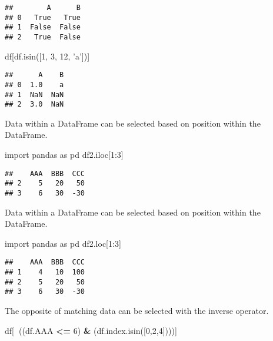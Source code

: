 \documentclass[]{book}
\newenvironment{Shaded}{\begin{snugshade}}{\end{snugshade}}
\newcommand{\DecValTok}[1]{\textcolor[rgb]{0.00,0.00,0.81}{#1}}
\newcommand{\StringTok}[1]{\textcolor[rgb]{0.31,0.60,0.02}{#1}}
\newcommand{\ImportTok}[1]{#1}
\newcommand{\OperatorTok}[1]{\textcolor[rgb]{0.81,0.36,0.00}{\textbf{#1}}}
\newcommand{\NormalTok}[1]{#1}
\begin{document}
\begin{verbatim}
##        A      B
## 0   True   True
## 1  False  False
## 2   True  False
\end{verbatim}

\begin{Shaded}
\begin{Highlighting}[]
\NormalTok{df[df.isin([}\DecValTok{1}\NormalTok{, }\DecValTok{3}\NormalTok{, }\DecValTok{12}\NormalTok{, }\StringTok{'a'}\NormalTok{])]}
\end{Highlighting}
\end{Shaded}

\begin{verbatim}
##      A    B
## 0  1.0    a
## 1  NaN  NaN
## 2  3.0  NaN
\end{verbatim}

Data within a DataFrame can be selected based on position within the
DataFrame.

\begin{Shaded}
\begin{Highlighting}[]
\ImportTok{import}\NormalTok{ pandas }\ImportTok{as}\NormalTok{ pd}
\NormalTok{df2.iloc[}\DecValTok{1}\NormalTok{:}\DecValTok{3}\NormalTok{]}
\end{Highlighting}
\end{Shaded}

\begin{verbatim}
##    AAA  BBB  CCC
## 2    5   20   50
## 3    6   30  -30
\end{verbatim}

Data within a DataFrame can be selected based on position within the
DataFrame.

\begin{Shaded}
\begin{Highlighting}[]
\ImportTok{import}\NormalTok{ pandas }\ImportTok{as}\NormalTok{ pd}
\NormalTok{df2.loc[}\DecValTok{1}\NormalTok{:}\DecValTok{3}\NormalTok{]}
\end{Highlighting}
\end{Shaded}

\begin{verbatim}
##    AAA  BBB  CCC
## 1    4   10  100
## 2    5   20   50
## 3    6   30  -30
\end{verbatim}

The opposite of matching data can be selected with the inverse operator.

\begin{Shaded}
\begin{Highlighting}[]
\NormalTok{df[}\OperatorTok{~}\NormalTok{((df.AAA }\OperatorTok{<=} \DecValTok{6}\NormalTok{) }\OperatorTok{&}\NormalTok{ (df.index.isin([}\DecValTok{0}\NormalTok{,}\DecValTok{2}\NormalTok{,}\DecValTok{4}\NormalTok{])))]}
\end{Highlighting}
\end{Shaded}
\end{document}
